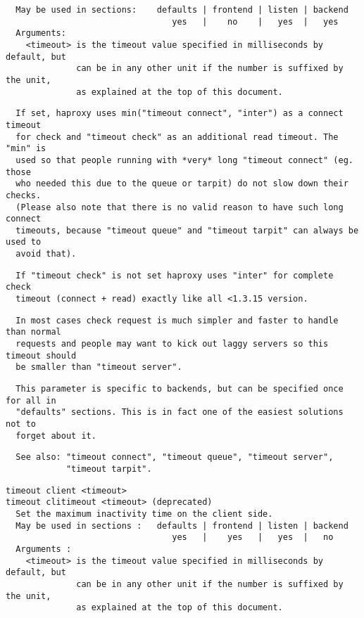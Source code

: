 \begin{verbatim}
  May be used in sections:    defaults | frontend | listen | backend
                                 yes   |    no    |   yes  |   yes
  Arguments:
    <timeout> is the timeout value specified in milliseconds by default, but
              can be in any other unit if the number is suffixed by the unit,
              as explained at the top of this document.
\end{verbatim}

\begin{verbatim}
  If set, haproxy uses min("timeout connect", "inter") as a connect timeout
  for check and "timeout check" as an additional read timeout. The "min" is
  used so that people running with *very* long "timeout connect" (eg. those
  who needed this due to the queue or tarpit) do not slow down their checks.
  (Please also note that there is no valid reason to have such long connect
  timeouts, because "timeout queue" and "timeout tarpit" can always be used to
  avoid that).
\end{verbatim}

\begin{verbatim}
  If "timeout check" is not set haproxy uses "inter" for complete check
  timeout (connect + read) exactly like all <1.3.15 version.
\end{verbatim}

\begin{verbatim}
  In most cases check request is much simpler and faster to handle than normal
  requests and people may want to kick out laggy servers so this timeout should
  be smaller than "timeout server".
\end{verbatim}

\begin{verbatim}
  This parameter is specific to backends, but can be specified once for all in
  "defaults" sections. This is in fact one of the easiest solutions not to
  forget about it.
\end{verbatim}

\begin{verbatim}
  See also: "timeout connect", "timeout queue", "timeout server",
            "timeout tarpit".
\end{verbatim}

\begin{verbatim}
timeout client <timeout>
timeout clitimeout <timeout> (deprecated)
  Set the maximum inactivity time on the client side.
  May be used in sections :   defaults | frontend | listen | backend
                                 yes   |    yes   |   yes  |   no
  Arguments :
    <timeout> is the timeout value specified in milliseconds by default, but
              can be in any other unit if the number is suffixed by the unit,
              as explained at the top of this document.
\end{verbatim}

